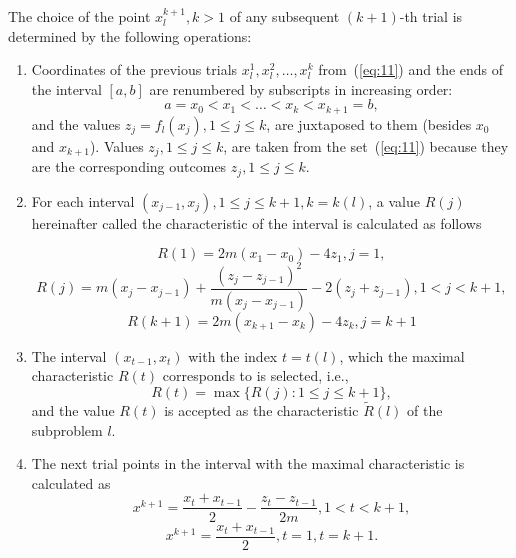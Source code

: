 \documentclass[smallextended]{svjour3}
\let\origref\ref
\renewcommand{\ref}[1]{(\origref{#1})}
\begin{document}
The choice of the point $x_l^{k + 1}, k > 1$ of any subsequent $(k + 1)$-th trial is determined by the following operations:
\begin{enumerate}[label=\bfseries Step \arabic*., leftmargin=0em, itemindent=*, itemsep=1em]
  \item Coordinates of the previous trials $x_l^1, x_l^2, \dots, x_l^k$ from~\ref{eq:11} and the ends of the interval $[a, b]$ are renumbered by subscripts in increasing order:
  \begin{equation}
  \label{eq:14}
  a = x_0 < x_1 < \dots < x_k < x_{k + 1} = b,
  \end{equation}
  and the values $z_j = f_l(x_j), 1 \leq j \leq k$, are juxtaposed to them (besides $x_0$ and $x_{k + 1}$). Values $z_j, 1 \leq j \leq k$, are taken from the set~\ref{eq:11} because they are the corresponding outcomes $z_j, 1 \leq j \leq k$.

  \item For each interval $(x_{j - 1}, x_j), 1 \leq j \leq k + 1, k = k(l)$, a value $R(j)$ hereinafter called the characteristic of the interval is calculated as follows

  \begin{equation*}
  R(1) = 2m(x_1 - x_0) - 4z_1, j = 1,
  \end{equation*}
  \begin{equation}
  \label{eq:15}
  R(j) = m(x_j - x_{j - 1}) + \frac{(z_j - z_{j - 1})^2}{m(x_j - x_{j - 1})} - 2(z_j + z_{j - 1}), 1 < j < k + 1,
  \end{equation}
  \begin{equation*}
  R(k + 1) = 2m(x_{k + 1} - x_k) - 4z_k, j = k + 1
  \end{equation*}

  \item The interval $(x_{t - 1}, x_t)$ with the index $t = t(l)$, which the maximal characteristic $R(t)$ corresponds to is selected, i.e.,
  \begin{equation}
  \label{eq:16}
  R(t) = \max \big\{ R(j): 1 \leq j \leq k + 1 \big\},
  \end{equation}
  and the value $R(t)$ is accepted as the characteristic $\widetilde{R}(l)$ of the subproblem $l$.

  \item The next trial points in the interval with the maximal characteristic is calculated as
  \begin{equation}
  \label{eq:17}
  x^{k + 1} = \frac{x_t + x_{t - 1}}{2} - \frac{z_t - z_{t - 1}}{2m}, 1 < t < k + 1,
  \end{equation}
  \begin{equation*}
  x^{k + 1} = \frac{x_t + x_{t - 1}}{2}, t = 1, t = k + 1.
  \end{equation*}


\end{enumerate}
\end{document}

